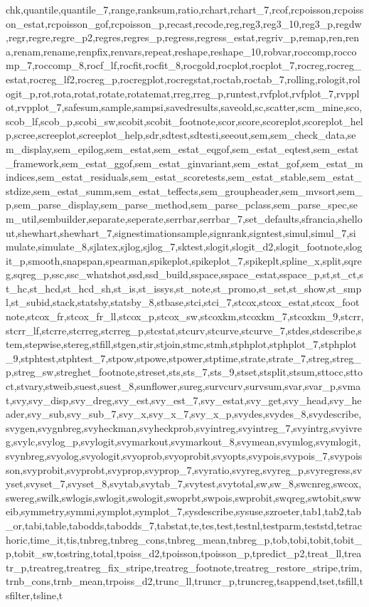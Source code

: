 {{chk,quantile,quantile_7,range,ranksum,ratio,rchart,rchart_7,rcof,rcpoisson,rcpoisson_estat,rcpoisson_gof,rcpoisson_p,recast,recode,reg,reg3,reg3_10,reg3_p,regdw,regr,regre,regre_p2,regres,regres_p,regress,regress_estat,regriv_p,remap,ren,rena,renam,rename,renpfix,renvars,repeat,reshape,reshape_10,robvar,roccomp,roccomp_7,roccomp_8,rocf_lf,rocfit,rocfit_8,rocgold,rocplot,rocplot_7,rocreg,rocreg_estat,rocreg_lf2,rocreg_p,rocregplot,rocregstat,roctab,roctab_7,rolling,rologit,rologit_p,rot,rota,rotat,rotate,rotatemat,rreg,rreg_p,runtest,rvfplot,rvfplot_7,rvpplot,rvpplot_7,safesum,sample,sampsi,savedresults,saveold,sc,scatter,scm_mine,sco,scob_lf,scob_p,scobi_sw,scobit,scobit_footnote,scor,score,scoreplot,scoreplot_help,scree,screeplot,screeplot_help,sdr,sdtest,sdtesti,seeout,sem,sem_check_data,sem_display,sem_epilog,sem_estat,sem_estat_eqgof,sem_estat_eqtest,sem_estat_framework,sem_estat_ggof,sem_estat_ginvariant,sem_estat_gof,sem_estat_mindices,sem_estat_residuals,sem_estat_scoretests,sem_estat_stable,sem_estat_stdize,sem_estat_summ,sem_estat_teffects,sem_groupheader,sem_mvsort,sem_p,sem_parse_display,sem_parse_method,sem_parse_pclass,sem_parse_spec,sem_util,sembuilder,separate,seperate,serrbar,serrbar_7,set_defaults,sfrancia,shellout,shewhart,shewhart_7,signestimationsample,signrank,signtest,simul,simul_7,simulate,simulate_8,sjlatex,sjlog,sjlog_7,sktest,slogit,slogit_d2,slogit_footnote,slogit_p,smooth,snapspan,spearman,spikeplot,spikeplot_7,spikeplt,spline_x,split,sqreg,sqreg_p,ssc,ssc_whatshot,ssd,ssd_build,sspace,sspace_estat,sspace_p,st,st_ct,st_hc,st_hcd,st_hcd_sh,st_is,st_issys,st_note,st_promo,st_set,st_show,st_smpl,st_subid,stack,statsby,statsby_8,stbase,stci,stci_7,stcox,stcox_estat,stcox_footnote,stcox_fr,stcox_fr_ll,stcox_p,stcox_sw,stcoxkm,stcoxkm_7,stcoxkm_9,stcrr,stcrr_lf,stcrre,stcrreg,stcrreg_p,stcstat,stcurv,stcurve,stcurve_7,stdes,stdescribe,stem,stepwise,stereg,stfill,stgen,stir,stjoin,stmc,stmh,stphplot,stphplot_7,stphplot_9,stphtest,stphtest_7,stpow,stpowe,stpower,stptime,strate,strate_7,streg,streg_p,streg_sw,streghet_footnote,streset,sts,sts_7,sts_9,stset,stsplit,stsum,sttocc,sttoct,stvary,stweib,suest,suest_8,sunflower,sureg,survcurv,survsum,svar,svar_p,svmat,svy,svy_disp,svy_dreg,svy_est,svy_est_7,svy_estat,svy_get,svy_head,svy_header,svy_sub,svy_sub_7,svy_x,svy_x_7,svy_x_p,svydes,svydes_8,svydescribe,svygen,svygnbreg,svyheckman,svyheckprob,svyintreg,svyintreg_7,svyintrg,svyivreg,svylc,svylog_p,svylogit,svymarkout,svymarkout_8,svymean,svymlog,svymlogit,svynbreg,svyolog,svyologit,svyoprob,svyoprobit,svyopts,svypois,svypois_7,svypoisson,svyprobit,svyprobt,svyprop,svyprop_7,svyratio,svyreg,svyreg_p,svyregress,svyset,svyset_7,svyset_8,svytab,svytab_7,svytest,svytotal,sw,sw_8,swcnreg,swcox,swereg,swilk,swlogis,swlogit,swologit,swoprbt,swpois,swprobit,swqreg,swtobit,swweib,symmetry,symmi,symplot,symplot_7,sysdescribe,sysuse,szroeter,tab1,tab2,tab_or,tabi,table,tabodds,tabodds_7,tabstat,te,tes,test,testnl,testparm,teststd,tetrachoric,time_it,tis,tnbreg,tnbreg_cons,tnbreg_mean,tnbreg_p,tob,tobi,tobit,tobit_p,tobit_sw,tostring,total,tpoiss_d2,tpoisson,tpoisson_p,tpredict_p2,treat_ll,treatr_p,treatreg,treatreg_fix_stripe,treatreg_footnote,treatreg_restore_stripe,trim,trnb_cons,trnb_mean,trpoiss_d2,trunc_ll,truncr_p,truncreg,tsappend,tset,tsfill,tsfilter,tsline,t}}
